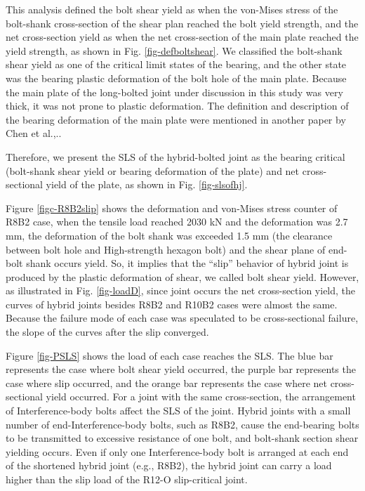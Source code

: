 This analysis defined the bolt shear yield as when the von-Mises stress of the bolt-shank cross-section of the shear plan reached the bolt yield strength, and the net cross-section yield as when the net cross-section of the main plate reached the yield strength, as shown in Fig. \ref{fig-defboltshear}. We classified the bolt-shank shear yield as one of the critical limit states of the bearing, and the other state was the bearing plastic deformation of the bolt hole of the main plate. Because the main plate of the long-bolted joint under discussion in this study was very thick, it was not prone to plastic deformation. The definition and description of the bearing deformation of the main plate were mentioned in another paper by Chen et al.,.\cite{chen2022jp}.

Therefore, we present the SLS of the hybrid-bolted joint as the bearing critical (bolt-shank shear yield or bearing deformation of the plate) and net cross-sectional yield of the plate, as shown in Fig. \ref{fig-slsofhj}.

Figure \ref{figc-R8B2slip} shows the deformation and von-Mises stress counter of R8B2 case, when the tensile load reached 2030 kN and the deformation was 2.7 mm, the deformation of the bolt shank was exceeded 1.5 mm (the clearance between bolt hole and High-strength hexagon bolt) and the shear plane of end-bolt shank occurs yield. So, it implies that the ``slip'' behavior of hybrid joint is produced by the plastic deformation of shear, we called bolt shear yield. However, as illustrated in Fig. \ref{fig-loadD}, since joint occurs the net cross-section yield, the curves of hybrid joints besides R8B2 and R10B2 cases were almost the same. Because the failure mode of each case was speculated to be cross-sectional failure, the slope of the curves after the slip converged. 

Figure \ref{fig-PSLS} shows the load of each case reaches the SLS. The blue bar represents the case where bolt shear yield occurred, the purple bar represents the case where slip occurred, and the orange bar represents the case where net cross-sectional yield occurred. For a joint with the same cross-section, the arrangement of Interference-body bolts affect the SLS of the joint. Hybrid joints with a small number of end-Interference-body bolts, such as R8B2, cause the end-bearing bolts to be transmitted to excessive resistance of one bolt, and bolt-shank section shear yielding occurs. Even if only one Interference-body bolt is arranged at each end of the shortened hybrid joint (e.g., R8B2), the hybrid joint can carry a load higher than the slip load of the R12-O slip-critical joint.

